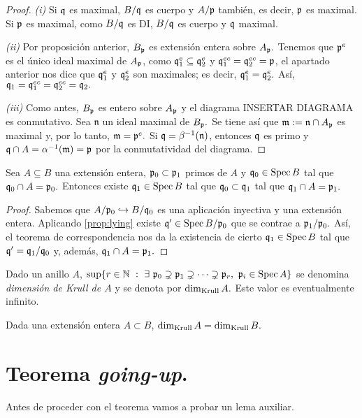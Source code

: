 \documentclass[../main.tex]{subfiles}
\begin{document}
	\begin{proof}
		\textit{(i)} Si $\mathfrak{q}$ es maximal, $B/\mathfrak{q}$ es cuerpo y $A/\mathfrak{p}$ también, es decir, $\mathfrak{p}$ es maximal. Si $\mathfrak{p}$ es maximal, como $B/\mathfrak{q}$ es DI, $B/\mathfrak{q}$ es cuerpo y $\mathfrak{q}$ maximal.
		
		\textit{(ii)} Por proposición anterior, $B_{\mathfrak{p}}$ es extensión entera sobre $A_{\mathfrak{p}}.$ Tenemos que $\mathfrak{p}^e$ es el único ideal maximal de $A_{\mathfrak{p}}$, como $\mathfrak{q}_1^e\subseteq \mathfrak{q}_2^e$ y $\mathfrak{q}_1^{ec}= \mathfrak{q}_2^{ec}=\mathfrak{p}$, el apartado anterior nos dice que $\mathfrak{q}_1^e$ y $\mathfrak{q}_2^e$ son maximales; es decir, $\mathfrak{q}_1^e=\mathfrak{q}_2^e.$ Así, $\mathfrak{q}_1=\mathfrak{q}_1^{ec}=\mathfrak{q}_2^{ec}=\mathfrak{q}_2.$
		
		\textit{(iii)} Como antes, $B_{\mathfrak{p}}$ es entero sobre $A_{\mathfrak{p}}$ y el diagrama INSERTAR DIAGRAMA es conmutativo. Sea $\mathfrak{n}$ un ideal maximal de $B_{\mathfrak{p}}.$ Se tiene así que $\mathfrak{m}:=\mathfrak{n}\cap A_{\mathfrak{p}}$ es maximal y, por lo tanto, $\mathfrak{m}=\mathfrak{p}^e.$ Si $\mathfrak{q}=\beta^{-1}(\mathfrak{n})$, entonces $\mathfrak{q}$ es primo y $\mathfrak{q}\cap A=\alpha^{-1}(\mathfrak{m})=\mathfrak{p}$ por la conmutatividad del diagrama.
	\end{proof}
	
	\begin{theorem}[Going-up]
		Sea $A\subseteq B$ una extensión entera, $\mathfrak{p}_0\subset\mathfrak{p}_1$ primos de $A$ y $\mathfrak{q}_0\in\operatorname{Spec} B$ tal que $\mathfrak{q}_0\cap  A=\mathfrak{p}_0.$ Entonces existe $\mathfrak{q}_1\in\operatorname{Spec} B$ tal que $\mathfrak{q}_0\subset\mathfrak{q}_1$ tal que $\mathfrak{q}_1\cap A=\mathfrak{p}_1.$
	\end{theorem}
	
	\begin{proof}
		Sabemos que $A/\mathfrak{p}_0\hookrightarrow B/\mathfrak{q}_0$ es una aplicación inyectiva y una extensión entera. Aplicando \ref{prop:lying} existe $\mathfrak{q}'\in\operatorname{Spec} {B/\mathfrak{p}_0}$ que se contrae a $\mathfrak{p}_1/\mathfrak{p}_0.$ Así, el teorema de correspondencia nos da la existencia de cierto $\mathfrak{q}_1\in\operatorname{Spec} B$ tal que $\mathfrak{q}'=\mathfrak{q}_1/\mathfrak{q}_0$ y, además, $\mathfrak{q}_1\cap A=\mathfrak{p}_1.$
	\end{proof}
	
	\begin{definition}
		Dado un anillo $A$, $\sup\{r\in\N\ :\ \exists\ \p_0\supsetneq\p_1\supsetneq\cdots\supsetneq\p_r,\ \p_i\in\Spec A\}$ se denomina \textit{dimensión de Krull de $A$} y se denota por $\dim_{\text{Krull}} A.$ Este valor es eventualmente infinito.
	\end{definition}
	
	\begin{corollary}
		Dada una extensión entera $A\subset B$, $\dim_{\text{Krull}} A=\dim_{\text{Krull}} B.$
	\end{corollary}
	
	\section{Teorema \textit{going-up}.}
	Antes de proceder con el teorema vamos a probar un lema auxiliar.
	
\end{document}
